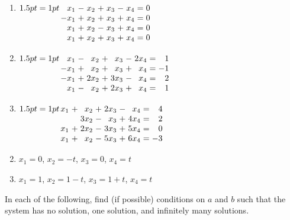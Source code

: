 \begin{multicols}{2}
\begin{ex}
\begin{enumerate}[label={\alph*.}]
\item
$\arraycolsep=1pt
\begin{array}[t]{rlrlrlrcr}
	 x_1 & - & x_2 & + & x_3 & - & x_4 & = & 0 \\
	-x_1 & + & x_2 & + & x_3 & + & x_4 & = & 0 \\
	 x_1 & + & x_2 & - & x_3 & + & x_4 & = & 0 \\
	 x_1 & + & x_2 & + & x_3 & + & x_4 & = & 0 \\
\end{array}$

\item 
$\arraycolsep=1pt
\begin{array}[t]{rlrlrlrcr}
	 x_1 & - &  x_2 & + &  x_3 & - & 2x_4 & = & 1 \\
	-x_1 & + &  x_2 & + &  x_3 & + &  x_4 & = & -1\\
	-x_1 & + & 2x_2 & + & 3x_3 & - &  x_4 & = & 2 \\
	 x_1 & - &  x_2 & + & 2x_3 & + &  x_4 & = & 1 \\
\end{array}$

\item 
$\arraycolsep=1pt
\begin{array}[t]{rlrlrlrcr}
	x_1 & + &  x_2 & + & 2x_3 & - &  x_4 & = & 4 \\
	    &   & 3x_2 & - &  x_3 & + & 4x_4 & = & 2 \\
	x_1 & + & 2x_2 & - & 3x_3 & + & 5x_4 & = & 0 \\
	x_1 & + &  x_2 & - & 5x_3 & + & 6x_4 & = & -3 \\
\end{array}$

\end{enumerate}
\begin{sol}
\begin{enumerate}[label={\alph*.}]
\setcounter{enumi}{1}
\item  $x_1 = 0$, $x_2 = -t$, $x_3 = 0$, $x_4 = t$

\setcounter{enumi}{3}
\item  $x_1 = 1$, $x_2 = 1 -t$, $x_3 = 1 + t$, $x_4 = t$

\end{enumerate}
\end{sol}
\end{ex}

\begin{ex}
In each of the following, find (if possible) conditions on $a$ and $b$ such that the system has no solution, one solution, and infinitely many solutions.


\end{ex}
\end{multicols}
